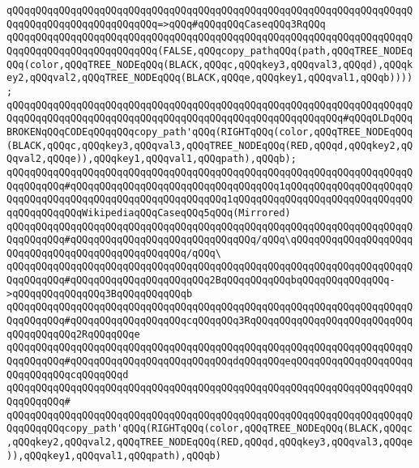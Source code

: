 \verb|qQQqqQQqqQQqqQQqqQQqqQQqqQQqqQQqqQQqqQQqqQQqqQQqqQQqqQQqqQQqqQQqqQQqqQQqqQQqqQQqqQQqqQQqqQQqqQQq=>qQQq#qQQqqQQqCaseqQQq3RqQQq|\newline
\verb|qQQqqQQqqQQqqQQqqQQqqQQqqQQqqQQqqQQqqQQqqQQqqQQqqQQqqQQqqQQqqQQqqQQqqQQqqQQqqQQqqQQqqQQqqQQqqQQq(FALSE,qQQqcopy_pathqQQq(path,qQQqTREE_NODEqQQq(color,qQQqTREE_NODEqQQq(BLACK,qQQqc,qQQqkey3,qQQqval3,qQQqd),qQQqkey2,qQQqval2,qQQqTREE_NODEqQQq(BLACK,qQQqe,qQQqkey1,qQQqval1,qQQqb))));|\newline
\newline
\verb|qQQqqQQqqQQqqQQqqQQqqQQqqQQqqQQqqQQqqQQqqQQqqQQqqQQqqQQqqQQqqQQqqQQqqQQqqQQqqQQqqQQqqQQqqQQqqQQqqQQqqQQqqQQqqQQqqQQqqQQqqQQqqQQq#qQQqOLDqQQqBROKENqQQqCODEqQQqqQQqcopy_path'qQQq(RIGHTqQQq(color,qQQqTREE_NODEqQQq(BLACK,qQQqc,qQQqkey3,qQQqval3,qQQqTREE_NODEqQQq(RED,qQQqd,qQQqkey2,qQQqval2,qQQqe)),qQQqkey1,qQQqval1,qQQqpath),qQQqb);|\newline
\newline
\verb|qQQqqQQqqQQqqQQqqQQqqQQqqQQqqQQqqQQqqQQqqQQqqQQqqQQqqQQqqQQqqQQqqQQqqQQqqQQqqQQq#qQQqqQQqqQQqqQQqqQQqqQQqqQQqqQQqqQQq1qQQqqQQqqQQqqQQqqQQqqQQqqQQqqQQqqQQqqQQqqQQqqQQqqQQqqQQqqQQq1qQQqqQQqqQQqqQQqqQQqqQQqqQQqqQQqqQQqqQQqqQQqWikipediaqQQqCaseqQQq5qQQq(Mirrored)|\newline
\verb|qQQqqQQqqQQqqQQqqQQqqQQqqQQqqQQqqQQqqQQqqQQqqQQqqQQqqQQqqQQqqQQqqQQqqQQqqQQqqQQq#qQQqqQQqqQQqqQQqqQQqqQQqqQQqqQQq/qQQq\qQQqqQQqqQQqqQQqqQQqqQQqqQQqqQQqqQQqqQQqqQQqqQQqqQQq/qQQq\|\newline
\verb|qQQqqQQqqQQqqQQqqQQqqQQqqQQqqQQqqQQqqQQqqQQqqQQqqQQqqQQqqQQqqQQqqQQqqQQqqQQqqQQq#qQQqqQQqqQQqqQQqqQQqqQQq2BqQQqqQQqqQQqbqQQqqQQqqQQqqQQq->qQQqqQQqqQQqqQQq3BqQQqqQQqqQQqb|\newline
\verb|qQQqqQQqqQQqqQQqqQQqqQQqqQQqqQQqqQQqqQQqqQQqqQQqqQQqqQQqqQQqqQQqqQQqqQQqqQQqqQQq#qQQqqQQqqQQqqQQqqQQqcqQQqqQQq3RqQQqqQQqqQQqqQQqqQQqqQQqqQQqqQQqqQQqqQQq2RqQQqqQQqe|\newline
\verb|qQQqqQQqqQQqqQQqqQQqqQQqqQQqqQQqqQQqqQQqqQQqqQQqqQQqqQQqqQQqqQQqqQQqqQQqqQQqqQQq#qQQqqQQqqQQqqQQqqQQqqQQqqQQqdqQQqqQQqeqQQqqQQqqQQqqQQqqQQqqQQqqQQqqQQqcqQQqqQQqd|\newline
\verb|qQQqqQQqqQQqqQQqqQQqqQQqqQQqqQQqqQQqqQQqqQQqqQQqqQQqqQQqqQQqqQQqqQQqqQQqqQQqqQQq#|\newline
\verb|qQQqqQQqqQQqqQQqqQQqqQQqqQQqqQQqqQQqqQQqqQQqqQQqqQQqqQQqqQQqqQQqqQQqqQQqqQQqqQQqcopy_path'qQQq(RIGHTqQQq(color,qQQqTREE_NODEqQQq(BLACK,qQQqc,qQQqkey2,qQQqval2,qQQqTREE_NODEqQQq(RED,qQQqd,qQQqkey3,qQQqval3,qQQqe)),qQQqkey1,qQQqval1,qQQqpath),qQQqb)|\newline
